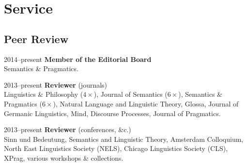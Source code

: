 \section*{Service}
\subsection*{Peer Review}
\begin{dated}
	\item[2014--present]
		\textbf{Member of the Editorial Board}\\
		Semantics \& Pragmatics.
	\item[2013--present]
		\textbf{Reviewer} (journals)\\
		Linguistics \& Philosophy ($4\times$),
		Journal of Semantics ($6\times$),
		Semantics \& Pragmatics ($6\times$),
		Natural Language and Linguistic Theory,
		Glossa,
		Journal of Germanic Linguistics,
		Mind,
		Discourse Processes,
		Journal of Pragmatics.
	\item[2013--present]
		 \textbf{Reviewer} (conferences, \&c.)\\
		Sinn und Bedeutung,
		Semantics and Linguistic Theory, 
		Amsterdam Colloquium, 
		North East Linguistics Society (NELS), 
		Chicago Linguistics Society (CLS), 
		XPrag, 
		various workshops \& collections.
\end{dated}
